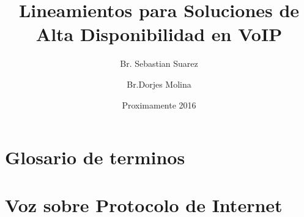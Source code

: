 \documentclass[12pt,oneside, letterpaper,openright]{book}
\title{Lineamientos para Soluciones de Alta Disponibilidad en VoIP}
\author{Br. Sebastian Suarez \and
		Br.Dorjes Molina}
\date{Proximamente 2016}
\begin{document}
	
	
	\maketitle
	\newpage
	


	\newpage
	
	\setcounter{tocdepth}{5}
	\tableofcontents
	
	\newpage
	
	\listoffigures
	
	\newpage
	\listoftables
	
	\chapter*{Glosario de terminos}

	\newpage
	

	\chapter{Voz sobre Protocolo de Internet}
	
\end{document}
